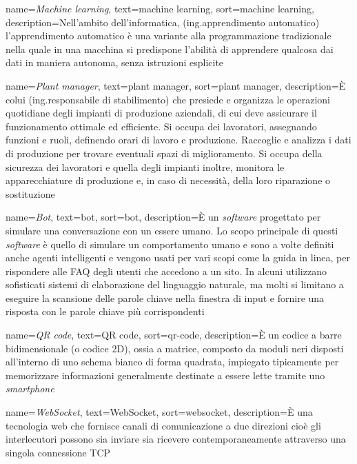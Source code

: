 {
	name={\textit{Machine learning}},
	text=machine learning,
	sort=machine learning,
	description={Nell'ambito dell'informatica, (ing.apprendimento automatico) l'apprendimento automatico è una variante alla programmazione tradizionale nella quale in una macchina si predispone l'abilità di apprendere qualcosa dai dati in maniera autonoma, senza istruzioni esplicite}
}

{
	name={\textit{Plant manager}},
	text=plant manager,
	sort=plant manager,
	description={È colui (ing.responsabile di stabilimento) che presiede e organizza le operazioni quotidiane degli impianti di produzione aziendali, di cui deve assicurare il funzionamento ottimale ed efficiente. Si occupa dei lavoratori, assegnando funzioni e ruoli, definendo orari di lavoro e produzione. Raccoglie e analizza i dati di produzione per trovare eventuali spazi di miglioramento. Si occupa della sicurezza dei lavoratori e quella degli impianti inoltre, monitora le apparecchiature di produzione e, in caso di necessità, della loro riparazione o sostituzione}
}

{
	name={\textit{Bot}},
	text=bot,
	sort=bot,
	description={È un \emph{software} progettato per simulare una conversazione con un essere umano. Lo scopo principale di questi \emph{software} è quello di simulare un comportamento umano e sono a volte definiti anche agenti intelligenti e vengono usati per vari scopi come la guida in linea, per rispondere alle FAQ degli utenti che accedono a un sito. In alcuni utilizzano sofisticati sistemi di elaborazione del linguaggio naturale, ma molti si limitano a eseguire la scansione delle parole chiave nella finestra di input e fornire una risposta con le parole chiave più corrispondenti}
}

{
	name={\textit{QR code}},
	text=QR code,
	sort=qr-code,
	description={È un codice a barre bidimensionale (o codice 2D), ossia a matrice, composto da moduli neri disposti all'interno di uno schema bianco di forma quadrata, impiegato tipicamente per memorizzare informazioni generalmente destinate a essere lette tramite uno \emph{smartphone}}
}

{
	name={\textit{WebSocket}},
	text=WebSocket,
	sort=websocket,
	description={È una tecnologia web che fornisce canali di comunicazione a due direzioni cioè gli interlecutori possono sia inviare sia ricevere contemporaneamente attraverso una singola connessione TCP}
}

